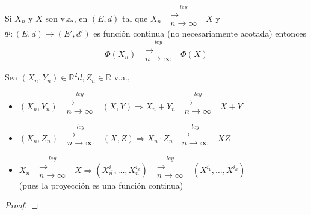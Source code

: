 \begin{theorem}
Si $X_n$ y $X$ son v.a., en $(E,d)$ tal que $X_n\mbox{ }\overset{ley}{\substack{\longrightarrow \\n \to \infty}}\mbox{ }X$ y $\Phi:(E,d)\longrightarrow (E',d')$ es función continua (no necesariamente acotada) entonces 
$$\Phi(X_n)\mbox{ }\overset{ley}{\substack{\longrightarrow \\n \to \infty}}\mbox{ }\Phi(X)$$
\end{theorem}
\demejercicio

\begin{property}
Sea $(X_n,Y_n)\in\mathbb{R}^2d,Z_n\in\mathbb{R}$ v.a.,
\begin{itemize}
    \item $(X_n,Y_n)\mbox{ }\overset{ley}{\substack{\longrightarrow \\n \to \infty}}\mbox{ }(X,Y)\Longrightarrow X_n+Y_n\mbox{ }\overset{ley}{\substack{\longrightarrow \\n \to \infty}}\mbox{ }X+Y$
    \item $(X_n,Z_n)\mbox{ }\overset{ley}{\substack{\longrightarrow \\n \to \infty}}\mbox{ }(X,Z)\Longrightarrow X_n\cdot Z_n\mbox{ }\overset{ley}{\substack{\longrightarrow \\n \to \infty}}\mbox{ }XZ$
    \item $X_n\mbox{ }\overset{ley}{\substack{\longrightarrow \\n \to \infty}}\mbox{ }X \Longrightarrow (X_n^{i_1},\dots,X_n^{i_k})\mbox{ }\overset{ley}{\substack{\longrightarrow \\n \to \infty}}\mbox{ }(X^{i_1},\dots,X^{i_k})$ \\ (pues la proyección es una función continua)
\end{itemize}
\end{property}
\begin{proof}
\ejercicio
\end{proof}

